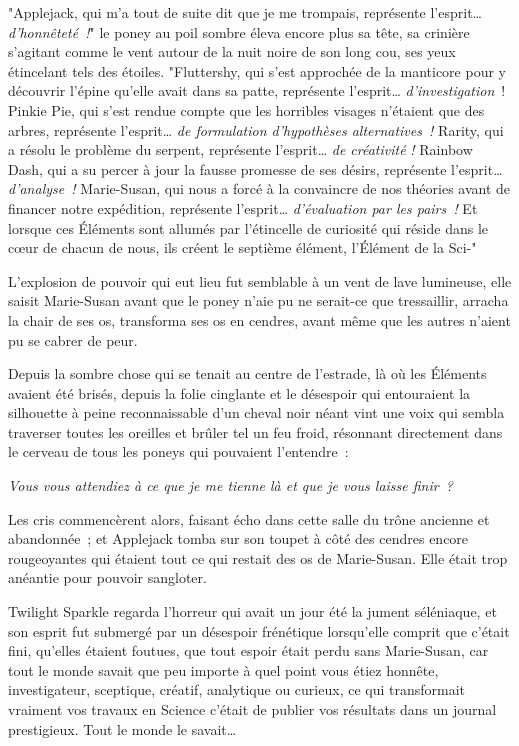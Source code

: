 "Applejack, qui m'a tout de suite dit que je me trompais, représente l'esprit… \emph{d'honnêteté~!}" le poney au poil sombre éleva encore plus sa tête, sa crinière s'agitant comme le vent autour de la nuit noire de son long cou, ses yeux étincelant tels des étoiles. "Fluttershy, qui s'est approchée de la manticore pour y découvrir l'épine qu'elle avait dans sa patte, représente l'esprit… \emph{d'investigation}~! Pinkie Pie, qui s'est rendue compte que les horribles visages n'étaient que des arbres, représente l'esprit… \emph{de formulation d'hypothèses alternatives~!} Rarity, qui a résolu le problème du serpent, représente l'esprit… \emph{de créativité} \emph{!} Rainbow Dash, qui a su percer à jour la fausse promesse de ses désirs, représente l'esprit… \emph{d'analyse~!} Marie-Susan, qui nous a forcé à la convaincre de nos théories avant de financer notre expédition, représente l'esprit… \emph{d'évaluation par les pairs~!} Et lorsque ces Éléments sont allumés par l'étincelle de curiosité qui réside dans le cœur de chacun de nous, ils créent le septième élément, l'Élément de la Sci-"

L'explosion de pouvoir qui eut lieu fut semblable à un vent de lave lumineuse, elle saisit Marie-Susan avant que le poney n'aie pu ne serait-ce que tressaillir, arracha la chair de ses os, transforma ses os en cendres, avant même que les autres n'aient pu se cabrer de peur.

Depuis la sombre chose qui se tenait au centre de l'estrade, là où les Éléments avaient été brisés, depuis la folie cinglante et le désespoir qui entouraient la silhouette à peine reconnaissable d'un cheval noir néant vint une voix qui sembla traverser toutes les oreilles et brûler tel un feu froid, résonnant directement dans le cerveau de tous les poneys qui pouvaient l'entendre~:

\emph{Vous vous attendiez à ce que je me tienne là et que je vous laisse finir~?}

Les cris commencèrent alors, faisant écho dans cette salle du trône ancienne et abandonnée~; et Applejack tomba sur son toupet à côté des cendres encore rougeoyantes qui étaient tout ce qui restait des os de Marie-Susan. Elle était trop anéantie pour pouvoir sangloter.

Twilight Sparkle regarda l'horreur qui avait un jour été la jument séléniaque, et son esprit fut submergé par un désespoir frénétique lorsqu'elle comprit que c'était fini, qu'elles étaient foutues, que tout espoir était perdu sans Marie-Susan, car tout le monde savait que peu importe à quel point vous étiez honnête, investigateur, sceptique, créatif, analytique ou curieux, ce qui transformait vraiment vos travaux en Science c'était de publier vos résultats dans un journal prestigieux. Tout le monde le savait…

